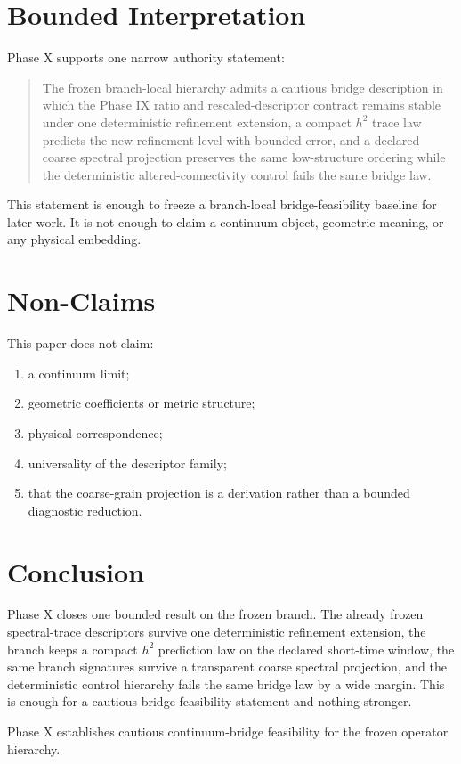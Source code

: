 \documentclass[11pt]{article}
\begin{document}
\section{Bounded Interpretation}

Phase X supports one narrow authority statement:
\begin{quote}
The frozen branch-local hierarchy admits a cautious bridge description in which the Phase IX ratio and rescaled-descriptor contract remains stable under one deterministic refinement extension, a compact $h^2$ trace law predicts the new refinement level with bounded error, and a declared coarse spectral projection preserves the same low-structure ordering while the deterministic altered-connectivity control fails the same bridge law.
\end{quote}

This statement is enough to freeze a branch-local bridge-feasibility baseline for later work. It is not enough to claim a continuum object, geometric meaning, or any physical embedding.

\section{Non-Claims}

This paper does not claim:
\begin{enumerate}
\item a continuum limit;
\item geometric coefficients or metric structure;
\item physical correspondence;
\item universality of the descriptor family;
\item that the coarse-grain projection is a derivation rather than a bounded diagnostic reduction.
\end{enumerate}

\section{Conclusion}

Phase X closes one bounded result on the frozen branch. The already frozen spectral-trace descriptors survive one deterministic refinement extension, the branch keeps a compact $h^2$ prediction law on the declared short-time window, the same branch signatures survive a transparent coarse spectral projection, and the deterministic control hierarchy fails the same bridge law by a wide margin. This is enough for a cautious bridge-feasibility statement and nothing stronger.

Phase X establishes cautious continuum-bridge feasibility for the frozen operator hierarchy.
\end{document}
